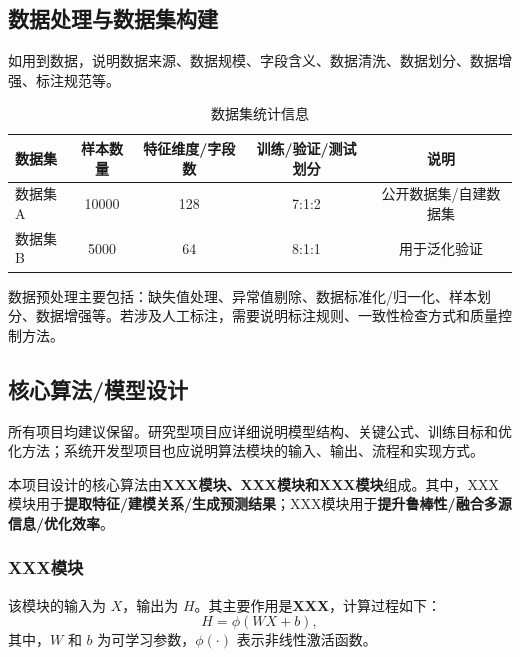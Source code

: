 \documentclass{style/course-report}
\begin{document}
\subsection{数据处理与数据集构建}

如用到数据，说明数据来源、数据规模、字段含义、数据清洗、数据划分、数据增强、标注规范等。

\begin{table}[H]
    \centering
    \caption{数据集统计信息}
    \begin{tabular}{lcccc}
        \toprule
        数据集 & 样本数量 & 特征维度/字段数 & 训练/验证/测试划分 & 说明 \\
        \midrule
        数据集A & 10000 & 128 & 7:1:2 & 公开数据集/自建数据集 \\
        数据集B & 5000 & 64 & 8:1:1 & 用于泛化验证 \\
        \bottomrule
    \end{tabular}
    \label{tab:dataset}
\end{table}

数据预处理主要包括：缺失值处理、异常值剔除、数据标准化/归一化、样本划分、数据增强等。若涉及人工标注，需要说明标注规则、一致性检查方式和质量控制方法。

\subsection{核心算法/模型设计}

所有项目均建议保留。研究型项目应详细说明模型结构、关键公式、训练目标和优化方法；系统开发型项目也应说明算法模块的输入、输出、流程和实现方式。

本项目设计的核心算法由\textbf{XXX模块、XXX模块和XXX模块}组成。其中，XXX模块用于\textbf{提取特征/建模关系/生成预测结果}；XXX模块用于\textbf{提升鲁棒性/融合多源信息/优化效率}。

\subsubsection{XXX模块}

该模块的输入为 $X$，输出为 $H$。其主要作用是\textbf{XXX}，计算过程如下：
\begin{equation}
    H = \phi(WX+b),
    \label{eq:module}
\end{equation}
其中，$W$ 和 $b$ 为可学习参数，$\phi(\cdot)$ 表示非线性激活函数。
\end{document}
